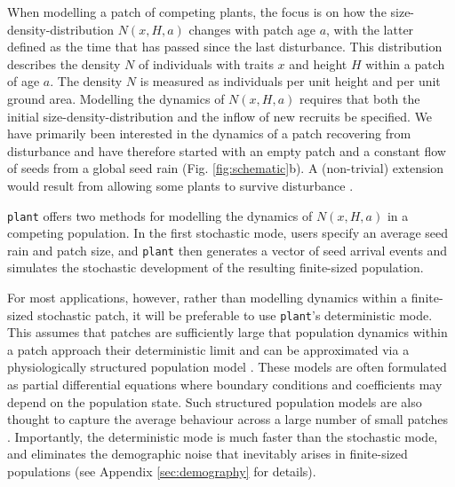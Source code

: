 \documentclass[a4paper,11pt]{article}
\newcommand{\plant}{\texttt{plant}}
\begin{document}
When modelling a patch of competing plants, the focus is on how the size-density-distribution \(N(x, H, a)\) changes with patch age \(a\), with the latter defined as the time that has passed since the last disturbance. This distribution describes the density \(N\) of
individuals with traits \(x\) and height \(H\) within a patch of age \(a\).
The density \(N\) is measured as individuals per unit height and per unit ground area.
Modelling the dynamics of \(N(x, H, a)\) requires that both the initial size-density-distribution and the inflow of new recruits be specified. We have primarily
been interested in the dynamics of a patch recovering from disturbance and have
therefore started with an empty patch and a constant flow of seeds from a global
seed rain (Fig. \ref{fig:schematic}b). A (non-trivial) extension would result from allowing some plants to survive disturbance \citep[following][]{Kohyama-1993}.

{\plant} offers two methods for modelling the dynamics of \(N(x,
H, a)\) in a competing population. In the first stochastic mode, users
specify an average seed rain and patch size, and {\plant} then generates a
vector of seed arrival events and simulates the stochastic
development of the resulting finite-sized population.

For most applications, however, rather than modelling
dynamics within a finite-sized stochastic patch, it will be preferable to use {\plant}'s
deterministic mode. This assumes that
patches are sufficiently large that population dynamics within a
patch approach their deterministic limit and can
be approximated via a physiologically structured population model \citep{Metz-1986, Deroos-1997, Kohyama-1993}. These models are often formulated as partial differential equations where boundary conditions and coefficients may depend on the population state. Such structured population models are also thought to
capture the average behaviour across a large number of small patches
\citep{Moorcroft-2001}. Importantly, the deterministic mode is
much faster than the stochastic mode, and eliminates the demographic noise
that inevitably arises in finite-sized populations (see Appendix \ref{sec:demography} for details).
\end{document}

